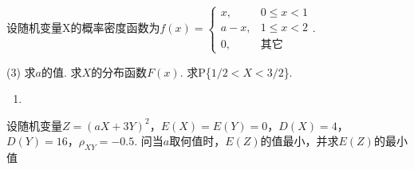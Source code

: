 \documentclass[
    newtxsf,
    twoside,openany,
]{litesolution}
\begin{document}
\begin{problem}
    设随机变量X的概率密度函数为$f(x)=
    \begin{cases}
        x,   & 0\leq x<1\\
        a-x, & 1\leq x<2\\
        0,   & \text{其它}
    \end{cases}$.
    \begin{tasks}[label=\arabic*.](3)
        \task 求$a$的值.
        \task 求$X$的分布函数$F(x)$.
        \task 求P\{$1/2<X<3/2$\}.
    \end{tasks}
\end{problem}
\begin{solution}\leavevmode
    \begin{enumerate}
        \item 
    \end{enumerate}
\end{solution}

\begin{problem}[本题7分]
    设随机变量$Z=(aX+3Y)^2$，$E(X)=E(Y)=0$，$D(X)=4$，$D(Y)=16$，$\rho_{XY}=-0.5$. 问当$a$取何值时，$E(Z)$的值最小，并求$E(Z)$的最小值
\end{problem}
\begin{solution}

\end{solution}
\end{document}
